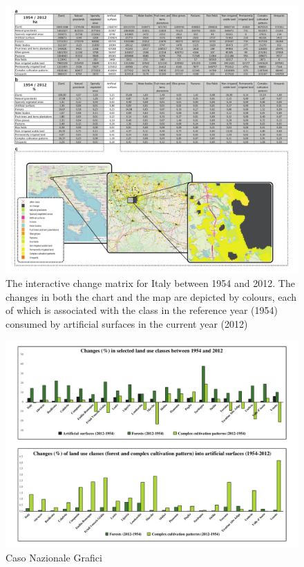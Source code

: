 \documentclass[APA,LATO1COL,doublespace]{WileyNJD-v2}
\begin{document}
\begin{figure}[t] %
    \centerline{\includegraphics[width=450pt]{daMileti/04_caso_nazionale.pdf}}
    \caption{ The interactive change matrix for Italy between 1954 and 2012.
    The changes in both the chart and the map are depicted by colours, each of which is associated with the class in the reference year (1954) consumed by artificial surfaces in the current year (2012) } \label{fig:caseIT}
\end{figure}

\begin{figure}
    \centerline{ \includegraphics[width=450pt]{daMileti/05_caso_nazionale_grafici.pdf} }
    \caption{Caso Nazionale Grafici}
    \label{fig:caseIT_graphs}
\end{figure}
\end{document}

